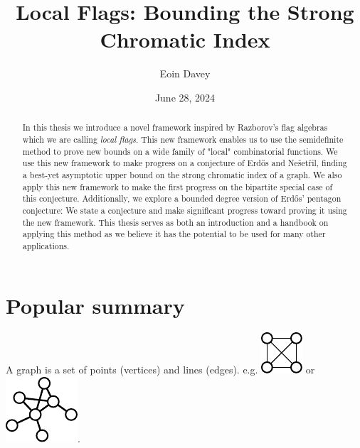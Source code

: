 \documentclass{uvamath}
\title{Local Flags: Bounding the Strong Chromatic Index} %
\author[eoin.davey@student.uva.nl, 14246287]{Eoin Davey} %
\date{June 28, 2024} %
\begin{document}
\maketitle
\restoregeometry

\begin{abstract}
    In this thesis we introduce a novel framework inspired by Razborov's flag algebras
    which we are calling \textit{local flags}. This new framework enables us to use
    the semidefinite method to prove new bounds on a wide family of "local" combinatorial
    functions. We use this new framework to
    make progress on a conjecture of Erd\H{o}s and Nešetřil, finding a
    best-yet asymptotic upper bound on the strong chromatic index of a graph.
    We also apply this new framework to make the first progress on the bipartite special case of
    this conjecture.
    Additionally, we explore a bounded degree version of Erd\H{o}s' pentagon
    conjecture: We state a conjecture and make significant progress toward proving it using
    the new framework. This thesis serves as both an introduction and a handbook on applying
    this method as we believe it has the potential to be used for many other applications.
\end{abstract}

\setcounter{tocdepth}{1}
\tableofcontents
\restoregeometry














\chapter*{Popular summary}
A graph is a set of points (vertices) and lines (edges).
e.g. \includegraphics[align=c,scale=1]{flags/k4} or
\includegraphics[align=c,scale=0.75]{pop_sum_graph}.
\end{document}
